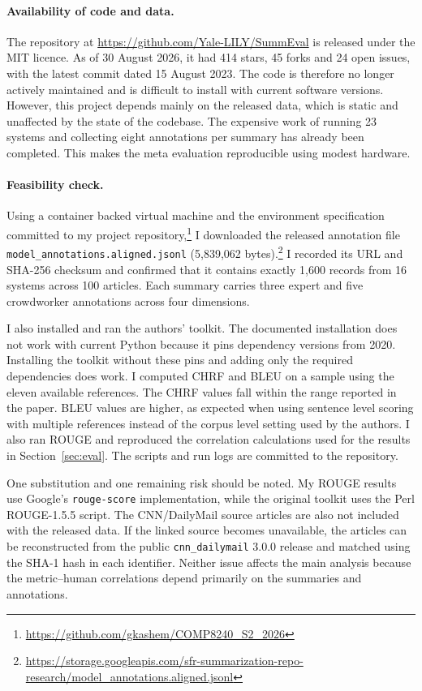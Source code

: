 \documentclass[11pt]{article}
\begin{document}
\paragraph{Availability of code and data.}
The repository at \url{https://github.com/Yale-LILY/SummEval} is released under the MIT licence. As of 30 August 2026, it had 414 stars, 45 forks and 24 open issues, with the latest commit dated 15 August 2023. The code is therefore no longer actively maintained and is difficult to install with current software versions. However, this project depends mainly on the released data, which is static and unaffected by the state of the codebase. The expensive work of running 23 systems and collecting eight annotations per summary has already been completed. This makes the meta evaluation reproducible using modest hardware.

\paragraph{Feasibility check.}
Using a container backed virtual machine and the environment specification committed to my project repository,\footnote{\url{https://github.com/gkashem/COMP8240_S2_2026}} I downloaded the released annotation file \texttt{model\_\allowbreak annotations.\allowbreak aligned.\allowbreak jsonl} (5{,}839{,}062 bytes).\footnote{\url{https://storage.googleapis.com/sfr-summarization-repo-research/model_annotations.aligned.jsonl}} I recorded its URL and SHA-256 checksum and confirmed that it contains exactly 1{,}600 records from 16 systems across 100 articles. Each summary carries three expert and five crowdworker annotations across four dimensions.

I also installed and ran the authors' toolkit. The documented installation does not work with current Python because it pins dependency versions from 2020. Installing the toolkit without these pins and adding only the required dependencies does work. I computed CHRF and BLEU on a sample using the eleven available references. The CHRF values fall within the range reported in the paper. BLEU values are higher, as expected when using sentence level scoring with multiple references instead of the corpus level setting used by the authors. I also ran ROUGE and reproduced the correlation calculations used for the results in Section~\ref{sec:eval}. The scripts and run logs are committed to the repository.

One substitution and one remaining risk should be noted. My ROUGE results use Google's \texttt{rouge-score} implementation, while the original toolkit uses the Perl ROUGE-1.5.5 script. The CNN/DailyMail source articles are also not included with the released data. If the linked source becomes unavailable, the articles can be reconstructed from the public \texttt{cnn\_dailymail} 3.0.0 release and matched using the SHA-1 hash in each identifier. Neither issue affects the main analysis because the metric--human correlations depend primarily on the summaries and annotations.
\end{document}
